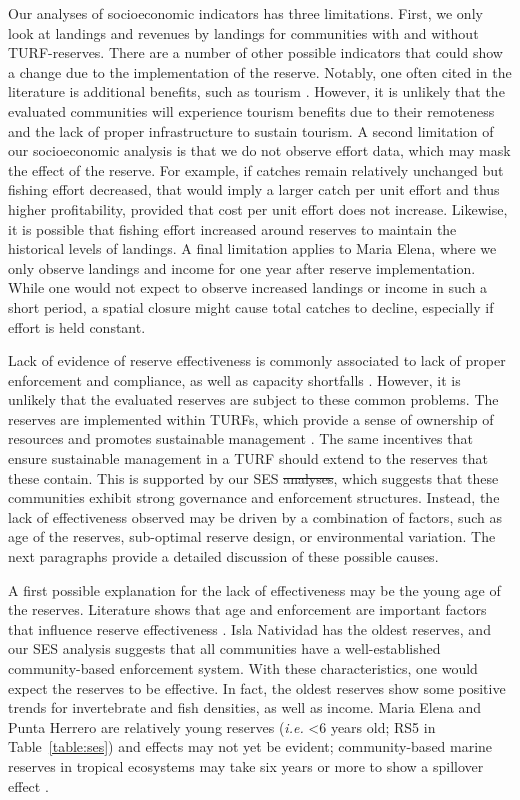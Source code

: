 \documentclass[10pt,letterpaper]{article}
\providecommand{\DIFaddtex}[1]{{\protect\color{blue}\uwave{#1}}} %
\providecommand{\DIFdeltex}[1]{{\protect\color{red}\sout{#1}}}                      %
\providecommand{\DIFaddbegin}{} %
\providecommand{\DIFaddend}{} %
\providecommand{\DIFdelbegin}{} %
\providecommand{\DIFdelend}{} %
\providecommand{\DIFadd}[1]{\texorpdfstring{\DIFaddtex{#1}}{#1}} %
\providecommand{\DIFdel}[1]{\texorpdfstring{\DIFdeltex{#1}}{}} %
\newcommand{\DIFscaledelfig}{0.5}
\newlength{\DIFdelgraphicswidth} %
\newlength{\DIFdelgraphicsheight} %
\newcommand{\DIFaddincludegraphics}[2][]{{\color{blue}\fbox{\DIFOincludegraphics[#1]{#2}}}} %
\newcommand{\DIFdelincludegraphics}[2][]{%
\sbox{\DIFdelgraphicsbox}{\DIFOincludegraphics[#1]{#2}}%
\settoboxwidth{\DIFdelgraphicswidth}{\DIFdelgraphicsbox} %
\settoboxtotalheight{\DIFdelgraphicsheight}{\DIFdelgraphicsbox} %
\scalebox{\DIFscaledelfig}{%
\parbox[b]{\DIFdelgraphicswidth}{\usebox{\DIFdelgraphicsbox}\\[-\baselineskip] \rule{\DIFdelgraphicswidth}{0em}}\llap{\resizebox{\DIFdelgraphicswidth}{\DIFdelgraphicsheight}{%
\setlength{\unitlength}{\DIFdelgraphicswidth}%
\begin{picture}(1,1)%
\thicklines\linethickness{2pt} %
{\color[rgb]{1,0,0}\put(0,0){\framebox(1,1){}}}%
{\color[rgb]{1,0,0}\put(0,0){\line( 1,1){1}}}%
{\color[rgb]{1,0,0}\put(0,1){\line(1,-1){1}}}%
\end{picture}%
}\hspace*{3pt}}} %
} %
\DeclareRobustCommand{\DIFaddbegin}{\DIFOaddbegin \let\includegraphics\DIFaddincludegraphics} %
\DeclareRobustCommand{\DIFaddend}{\DIFOaddend \let\includegraphics\DIFOincludegraphics} %
\DeclareRobustCommand{\DIFdelbegin}{\DIFOdelbegin \let\includegraphics\DIFdelincludegraphics} %
\DeclareRobustCommand{\DIFdelend}{\DIFOaddend \let\includegraphics\DIFOincludegraphics} %
\begin{document}
Our analyses of socioeconomic indicators has three limitations. First, we only look at landings and revenues by landings for communities with and without TURF-reserves. There are a number of other possible indicators that could show a change due to the implementation of the reserve. Notably, one often cited in the literature is additional benefits, such as tourism \cite{viana_2017}. However, it is unlikely that the evaluated communities will experience tourism benefits due to their remoteness and the lack of proper infrastructure to sustain tourism. A second limitation of our socioeconomic analysis is that we do not observe effort data, which may mask the effect of the reserve. For example, if catches remain relatively unchanged but fishing effort decreased, that would imply a larger catch per unit effort and thus higher profitability, provided that cost per unit effort does not increase. Likewise, it is possible that fishing effort increased around reserves to maintain the historical levels of landings. A final limitation applies to Maria Elena, where we only observe landings and income for one year after reserve implementation. While one would not expect to observe increased landings or income in such a short period, a spatial closure might cause total catches to decline, especially if effort is held constant.

Lack of evidence of reserve effectiveness is commonly associated to lack of proper enforcement and compliance, as well as capacity shortfalls \cite{edgar_2014-UO,difranco_2016-Xw,gill_2017}. However, it is unlikely that the evaluated reserves are subject to these common problems. The reserves are implemented within TURFs, which provide a sense of ownership of resources and promotes sustainable management \cite{mccay_2017}. The same incentives that ensure sustainable management in a TURF should extend to the reserves that these contain. This is supported by our SES \DIFdelbegin \DIFdel{analyses}\DIFdelend \DIFaddbegin \DIFadd{analysis}\DIFaddend , which suggests that these communities exhibit strong governance and enforcement structures. Instead, the lack of effectiveness observed may be driven by a combination of factors, such as age of the reserves, sub-optimal reserve design, or environmental variation. The next paragraphs provide a detailed discussion of these possible causes.

A first possible explanation for the lack of effectiveness may be the young age of the reserves. Literature shows that age and enforcement are important factors that influence reserve effectiveness \cite{edgar_2014-UO,babcock_2010}. Isla Natividad has the oldest reserves, and our SES analysis suggests that all communities have a well-established community-based enforcement system. With these characteristics, one would expect the reserves to be effective. In fact, the oldest reserves show some positive trends for invertebrate and fish densities, as well as income. Maria Elena and Punta Herrero are relatively young reserves (\emph{i.e.} \textless 6 years old; RS5 in Table~\ref{table:ses}) and effects may not yet be evident; community-based marine reserves in tropical ecosystems may take six years or more to show a spillover effect \cite{dasilva_2015-zX}. 
\end{document}
